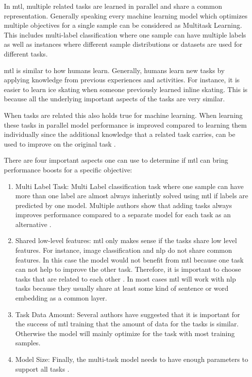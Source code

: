 In \gls{mtl}, multiple related tasks are learned in parallel and share a common representation. Generally speaking every machine learning model which optimizes multiple objectives for a single sample can be considered as Multitask Learning. This includes multi-label classification where one sample can have multiple labels as well as instances where different sample distributions or datasets are used for different tasks.

\gls{mtl} is similar to how humans learn. Generally, humans learn new tasks by applying knowledge from previous experiences and activities. For instance, it is easier to learn ice skating when someone previously learned inline skating. This is because all the underlying important aspects of the tasks are very similar.

When tasks are related this also holds true for machine learning. When learning these tasks in parallel model performance is improved compared to learning them individually since the additional knowledge that a related task carries, can be used to improve on the original task \cite{Caruana1997a}. 

There are four important aspects one can use to determine if \gls{mtl} can bring performance boosts for a specific objective:
\begin{enumerate}
	\item Multi Label Task: Multi Label classification task where one sample can have more than one label are almost always inherintly solved using \gls{mtl} if labels are predicted by one model. Multiple authors show that adding tasks always improves performance compared to a separate model for each task as an alternative \cite{Ramsundar2015}. %
	\item Shared low-level features: \gls{mtl} only makes sense if the tasks share low level features. For instance, image classification and \gls{nlp} do not share common features. In this case the model would not benefit from \gls{mtl} because one task can not help to improve the other task. Therefore, it is important to choose tasks that are related to each other \cite{Zhang2017a}. In most cases \gls{mtl} will work with \gls{nlp} tasks because they usually share at least some kind of sentence or word embedding as a common layer.   %
	\item Task Data Amount: Several authors have suggested that it is important for the success of \gls{mtl} training that the amount of data for the tasks is similar. Otherwise the model will mainly optimize for the task with most training samples.
	\item Model Size: Finally, the multi-task model needs to have enough parameters to support all tasks \cite{Caruana1997a}. 
	\end{enumerate}


